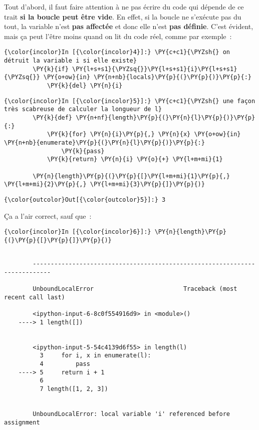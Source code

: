     Tout d'abord, il faut faire attention à ne pas écrire du code qui
dépende de ce trait \textbf{si la boucle peut être vide}. En effet, si
la boucle ne s'exécute pas du tout, la variable n'est \textbf{pas
affectée} et donc elle n'est \textbf{pas définie}. C'est évident, mais
ça peut l'être moins quand on lit du code réel, comme par exemple~:

    \begin{Verbatim}[commandchars=\\\{\}]
{\color{incolor}In [{\color{incolor}4}]:} \PY{c+c1}{\PYZsh{} on détruit la variable i si elle existe}
        \PY{k}{if} \PY{l+s+s1}{\PYZsq{}}\PY{l+s+s1}{i}\PY{l+s+s1}{\PYZsq{}} \PY{o+ow}{in} \PY{n+nb}{locals}\PY{p}{(}\PY{p}{)}\PY{p}{:} 
            \PY{k}{del} \PY{n}{i}   
\end{Verbatim}


    \begin{Verbatim}[commandchars=\\\{\}]
{\color{incolor}In [{\color{incolor}5}]:} \PY{c+c1}{\PYZsh{} une façon très scabreuse de calculer la longueur de l}
        \PY{k}{def} \PY{n+nf}{length}\PY{p}{(}\PY{n}{l}\PY{p}{)}\PY{p}{:}
            \PY{k}{for} \PY{n}{i}\PY{p}{,} \PY{n}{x} \PY{o+ow}{in} \PY{n+nb}{enumerate}\PY{p}{(}\PY{n}{l}\PY{p}{)}\PY{p}{:}
                \PY{k}{pass}
            \PY{k}{return} \PY{n}{i} \PY{o}{+} \PY{l+m+mi}{1}
        
        \PY{n}{length}\PY{p}{(}\PY{p}{[}\PY{l+m+mi}{1}\PY{p}{,} \PY{l+m+mi}{2}\PY{p}{,} \PY{l+m+mi}{3}\PY{p}{]}\PY{p}{)}
\end{Verbatim}


\begin{Verbatim}[commandchars=\\\{\}]
{\color{outcolor}Out[{\color{outcolor}5}]:} 3
\end{Verbatim}
            
    Ça a l'air correct, sauf que~:

    \begin{Verbatim}[commandchars=\\\{\}]
{\color{incolor}In [{\color{incolor}6}]:} \PY{n}{length}\PY{p}{(}\PY{p}{[}\PY{p}{]}\PY{p}{)}
\end{Verbatim}


    \begin{Verbatim}[commandchars=\\\{\}]

        ---------------------------------------------------------------------------

        UnboundLocalError                         Traceback (most recent call last)

        <ipython-input-6-8c0f554916d9> in <module>()
    ----> 1 length([])
    

        <ipython-input-5-54c4139d6f55> in length(l)
          3     for i, x in enumerate(l):
          4         pass
    ----> 5     return i + 1
          6 
          7 length([1, 2, 3])
    

        UnboundLocalError: local variable 'i' referenced before assignment

    \end{Verbatim}


